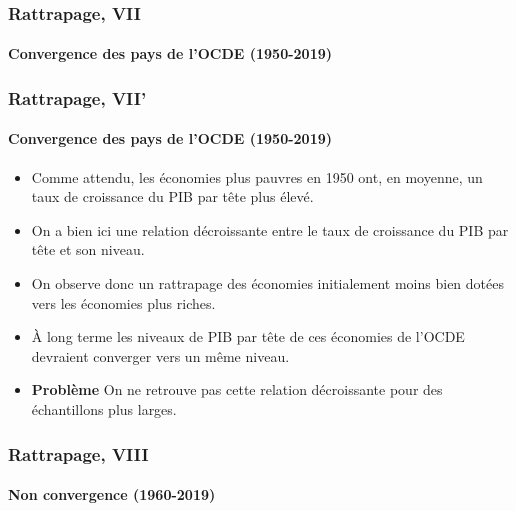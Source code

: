 \documentclass[10pt,notheorems]{beamer}
\theoremstyle{plain}
\theoremstyle{definition} %
\begin{document}
\begin{frame}
  \frametitle{Rattrapage, VII}
  \framesubtitle{Convergence des pays de l'OCDE (1950-2019)}
  \begin{Center}
    
  \end{Center}

\end{frame}


\begin{frame}
  \frametitle{Rattrapage, VII'}
  \framesubtitle{Convergence des pays de l'OCDE (1950-2019)}

  \begin{itemize}

  \item Comme attendu, les économies plus pauvres en 1950 ont, en moyenne, un taux de croissance du PIB par tête plus élevé.\newline

  \item On a bien ici une relation décroissante entre le taux de croissance du PIB par tête et son niveau.\newline

  \item On observe donc un rattrapage des économies initialement moins bien dotées vers les économies plus riches.\newline

  \item À long terme les niveaux de PIB par tête de ces économies de l'OCDE devraient converger vers un même niveau.\newline

    \medskip

  \item \textbf{Problème} On ne retrouve pas cette relation décroissante pour des échantillons plus larges.

  \end{itemize}

\end{frame}


\begin{frame}
  \frametitle{Rattrapage, VIII}
  \framesubtitle{Non convergence (1960-2019)}

  \begin{Center}
    
  \end{Center}

\end{frame}
\end{document}
